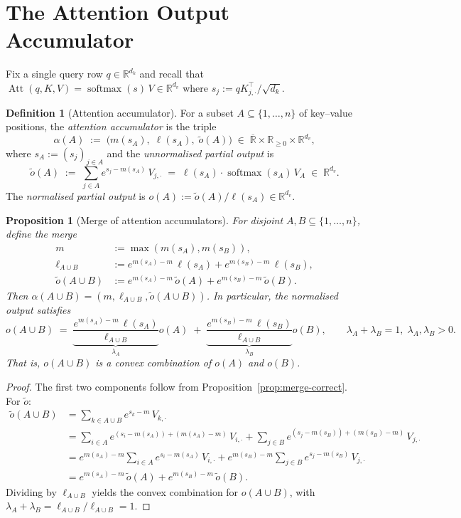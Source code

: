 \documentclass[11pt]{amsart}
\theoremstyle{plain}
\newtheorem{proposition}[theorem]{Proposition}
\theoremstyle{definition}
\newtheorem{definition}[theorem]{Definition}
\newcommand{\R}{\mathbb{R}}
\newcommand{\softmax}{\operatorname{softmax}}
\newcommand{\Att}{\operatorname{Att}}
\begin{document}
\section{The Attention Output Accumulator}
\label{sec:output-accumulator}

Fix a single query row $q \in \R^{d_k}$ and recall that
$\Att(q,K,V)=\softmax(s)\,V \in \R^{d_v}$ where
$s_j := q K_{j,\cdot}^{\top}/\sqrt{d_k}$.

\begin{definition}[Attention accumulator]
\label{def:attention-accumulator}
For a subset $A\subseteq\{1,\ldots,n\}$ of key--value positions, the
\emph{attention accumulator} is the triple
\[
    \alpha(A)
    \;:=\;
    \bigl(m(s_A),\;\ell(s_A),\;\tilde{o}(A)\bigr)
    \;\in\; \overline{\R} \times \R_{\geq 0} \times \R^{d_v},
\]
where $s_A := (s_j)_{j\in A}$ and the \emph{unnormalised partial output} is
\[
    \tilde{o}(A)
    \;:=\; \sum_{j\in A} e^{s_j - m(s_A)}\,V_{j,\cdot}
    \;=\; \ell(s_A)\cdot\softmax(s_A)\,V_A
    \;\in\; \R^{d_v}.
\]
The \emph{normalised partial output} is $o(A) := \tilde{o}(A)/\ell(s_A)
\in \R^{d_v}$.
\end{definition}

\begin{proposition}[Merge of attention accumulators]
\label{prop:accumulator-merge}
For disjoint $A,B\subseteq\{1,\ldots,n\}$, define the merge
\begin{align*}
    m &:= \max(m(s_A), m(s_B)), \\
    \ell_{A\cup B} &:= e^{m(s_A)-m}\,\ell(s_A) + e^{m(s_B)-m}\,\ell(s_B), \\
    \tilde{o}(A\cup B) &:= e^{m(s_A)-m}\,\tilde{o}(A) + e^{m(s_B)-m}\,\tilde{o}(B).
\end{align*}
Then $\alpha(A\cup B) = (m, \ell_{A\cup B}, \tilde{o}(A\cup B))$.  In
particular, the normalised output satisfies
\[
    o(A\cup B)
    \;=\;
    \underbrace{\frac{e^{m(s_A)-m}\,\ell(s_A)}{\ell_{A\cup B}}}_{\lambda_A}
    o(A)
    \;+\;
    \underbrace{\frac{e^{m(s_B)-m}\,\ell(s_B)}{\ell_{A\cup B}}}_{\lambda_B}
    o(B),
    \qquad \lambda_A + \lambda_B = 1,\; \lambda_A, \lambda_B > 0.
\]
That is, $o(A\cup B)$ is a \emph{convex combination} of $o(A)$ and $o(B)$.
\end{proposition}
\begin{proof}
The first two components follow from Proposition~\ref{prop:merge-correct}.
For $\tilde{o}$:
\begin{align*}
    \tilde{o}(A\cup B)
    &= \sum_{k\in A\cup B} e^{s_k - m}\,V_{k,\cdot} \\
    &= \sum_{i\in A} e^{(s_i - m(s_A)) + (m(s_A) - m)}\,V_{i,\cdot}
     + \sum_{j\in B} e^{(s_j - m(s_B)) + (m(s_B) - m)}\,V_{j,\cdot} \\
    &= e^{m(s_A)-m}\sum_{i\in A} e^{s_i - m(s_A)}\,V_{i,\cdot}
     + e^{m(s_B)-m}\sum_{j\in B} e^{s_j - m(s_B)}\,V_{j,\cdot} \\
    &= e^{m(s_A)-m}\,\tilde{o}(A) + e^{m(s_B)-m}\,\tilde{o}(B).
\end{align*}
Dividing by $\ell_{A\cup B}$ yields the convex combination for $o(A\cup B)$,
with $\lambda_A + \lambda_B = \ell_{A\cup B}/\ell_{A\cup B} = 1$.
\end{proof}
\end{document}
